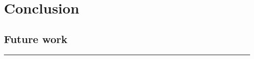 \chapter{Conclusion} \label{ch:conclusion}
\todo

\section{Future work}
\todo

\noindent\rule{\textwidth}{0.4mm}
